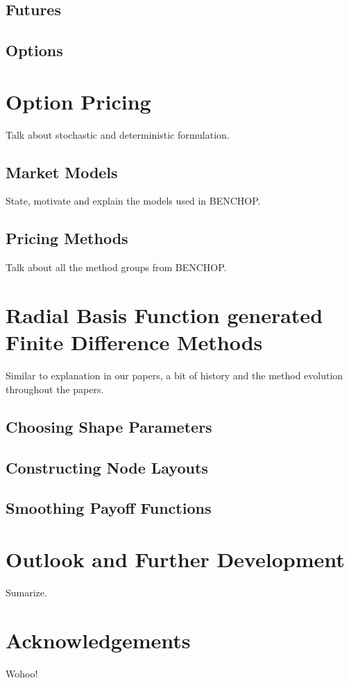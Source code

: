 \documentclass{UUThesisTemplate}
\begin{document}
\section{Futures}
\section{Options}
\chapter{Option Pricing}
Talk about stochastic and deterministic formulation.
\section{Market Models}
State, motivate and explain the models used in BENCHOP.
\section{Pricing Methods}
Talk about all the method groups from BENCHOP.
%
%
\chapter{Radial Basis Function generated Finite Difference Methods}
Similar to explanation in our papers, a bit of history and the method evolution throughout the papers.
\section{Choosing Shape Parameters}
\section{Constructing Node Layouts}
\section{Smoothing Payoff Functions}
%
%
\chapter{Outlook and Further Development}
Sumarize.

\backmatter
%    
%    

\chapter{Acknowledgements}
Wohoo!
\end{document}
